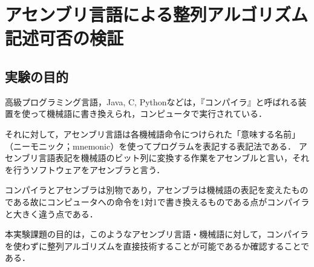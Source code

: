 \chapter{アセンブリ言語による整列アルゴリズム記述可否の検証}\label{chap1}
\section{実験の目的}
高級プログラミング言語，{\ttfamily Java, C, Python}などは，『コンパイラ』と呼ばれる装置を使って機械語に書き換えられ，コンピュータで実行されている．\par
それに対して，アセンブリ言語は各機械語命令につけられた「意味する名前」（ニーモニック；mnemonic）を使ってプログラムを表記する表記法である．\cite[第1章]{pl2text}
アセンブリ言語表記を機械語のビット列に変換する作業をアセンブルと言い，それを行うソフトウェアをアセンブラと言う．\par
コンパイラとアセンブラは別物であり，アセンブラは機械語の表記を変えたものである故にコンピュータへの命令を1対1で書き換えるものである点がコンパイラと大きく違う点である．\par
本実験課題の目的は，このようなアセンブリ言語・機械語に対して，コンパイラを使わずに整列アルゴリズムを直接技術することが可能であるか確認することである．
